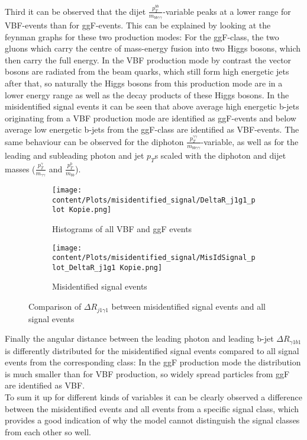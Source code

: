 Third it can be observed that the dijet $\frac{p_T^{bb}}{m_{bb \gamma \gamma}}$-variable peaks at a lower range for VBF-events than for ggF-events. This can be explained by looking at the 
feynman graphs for these two production modes: For the ggF-class, the two gluons which carry the centre of mass-energy fusion into two Higgs bosons, which then carry the full energy. In the VBF
production mode by contrast the vector bosons are radiated from the beam quarks, which still form high energetic jets after that, so naturally the Higgs bosons from this production mode
are in a lower energy range as well as the decay products of these Higgs bosons. In the misidentified signal events it can be seen that above average high energetic b-jets originating from a VBF production mode
are identified as ggF-events and below average low energetic b-jets from the ggF-class are identified as VBF-events. The same behaviour can be observed for the diphoton $\frac{p_T^{\gamma \gamma}}{m_{bb \gamma \gamma}}$-variable,
as well as for the leading and subleading photon and jet $p_T$s scaled with the diphoton and dijet masses ($\frac{p_T^{\gamma}}{m_{\gamma \gamma}}$ and $\frac{p_T^{b}}{m_{bb}}$).

\begin{figure}[H]
    \centering
    \begin{subfigure}{0.45\textwidth}
        \centering
        \texttt{[image: content/Plots/misidentified\_signal/DeltaR\_j1g1\_plot Kopie.png]}
        \caption{Histograms of all VBF and ggF events}
        \label{fig:roc1}
    \end{subfigure}
    \hfill
    \begin{subfigure}{0.45\textwidth}
        \centering
        \texttt{[image: content/Plots/misidentified\_signal/MisIdSignal\_plot\_DeltaR\_j1g1 Kopie.png]}
        \caption{Misidentified signal events}
        \label{fig:roc2}
    \end{subfigure}
    \caption{Comparison of $\Delta R_{j1 \gamma 1}$ between misidentified signal events and all signal events}
    \label{fig:combined_roc}
\end{figure}

Finally the angular distance between the leading photon and leading b-jet $\Delta R_{\gamma1 b1}$ is differently distributed for the misidentified signal events compared to all signal events from the corresponding class:
In the ggF production mode the distribution is much smaller than for VBF production, so widely spread particles from ggF are identified as VBF. \\

To sum it up for different kinds of variables it can be clearly observed a difference between the misidentified events and all events from a specific signal class, 
which provides a good indication of why the model cannot distinguish the signal classes from each other so well.